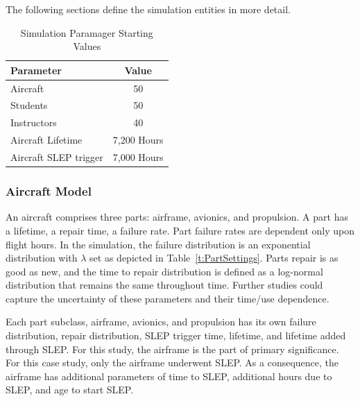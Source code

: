 \documentclass[preprint,12pt]{elsarticle}
\begin{document}
The following sections define the simulation entities in more detail.

\begin{table}[h]
\begin{center}
    \caption{Simulation Paramager Starting Values }
  \label{t:StartingValues}
    \begin{tabular}{l c }
      \hline
      \hline
      \textbf{Parameter} & \textbf{Value} \\
      \hline
      Aircraft & 50 \\
      Students & 50 \\
      Instructors & 40 \\
      Aircraft Lifetime & 7,200 Hours \\
      Aircraft SLEP trigger & 7,000 Hours \\
      \hline
    \end{tabular}
    \end{center}
\end{table}

\subsubsection{Aircraft Model}
An aircraft comprises three parts: airframe, avionics, and
propulsion. A part has a lifetime, a repair time, a failure rate. Part
failure rates are dependent only upon flight hours. In the simulation,
the failure distribution is an exponential distribution with $\lambda$
set as depicted in Table~\ref{t:PartSettings}. Parts repair is
as good as new, and the time to repair distribution is defined as a
log-normal distribution that remains the same throughout time. Further
studies could capture the uncertainty of these parameters and their
time/use dependence. 

Each part subclass, airframe, avionics, and propulsion has its own
failure distribution, repair distribution, SLEP trigger time,
lifetime, and lifetime added through SLEP. For this study, the
airframe is the part of primary significance. For  this case study,
only the airframe underwent SLEP. As a consequence, the airframe has
additional parameters of time to SLEP, additional  hours due to SLEP,
and age to start SLEP.
\end{document}
